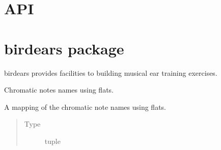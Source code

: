 \documentclass[letterpaper,10pt,english]{sphinxmanual}
\begin{document}
\chapter{API}
\label{\detokenize{index:api}}

\chapter{birdears package}
\label{\detokenize{index:module-birdears}}\label{\detokenize{index:birdears-package}}
\sphinxAtStartPar
birdears provides facilities to building musical ear training exercises.

\begin{fulllineitems}
\label{\detokenize{index:birdears.CHROMATIC_FLAT}}
\sphinxAtStartPar
Chromatic notes names using flats.

\sphinxAtStartPar
A mapping of the chromatic note names using flats.
\begin{quote}\begin{description}
\item[{Type}] \leavevmode
\sphinxAtStartPar
tuple

\end{description}\end{quote}

\end{fulllineitems}

\end{document}

